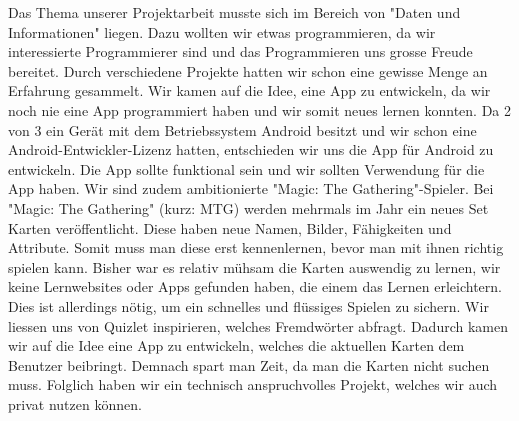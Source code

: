 Das Thema unserer Projektarbeit musste sich im Bereich von "Daten und Informationen" liegen. Dazu wollten wir etwas programmieren, da wir interessierte Programmierer sind und das Programmieren uns grosse Freude bereitet. Durch verschiedene Projekte hatten wir schon eine gewisse Menge an Erfahrung gesammelt. Wir kamen auf die Idee, eine App zu entwickeln, da wir noch nie eine App programmiert haben und wir somit neues lernen konnten. Da 2 von 3 ein Ger\"at mit dem Betriebssystem Android besitzt und wir schon eine Android-Entwickler-Lizenz hatten, entschieden wir uns die App f\"ur Android zu entwickeln. Die App sollte funktional sein und wir sollten Verwendung f\"ur die App haben. Wir sind zudem ambitionierte "Magic: The Gathering"-Spieler. Bei "Magic: The Gathering" (kurz: MTG) werden mehrmals im Jahr ein neues Set Karten ver\"offentlicht. Diese haben neue Namen, Bilder, Fähigkeiten und Attribute. Somit muss man diese erst kennenlernen, bevor man mit ihnen richtig spielen kann. Bisher war es relativ m\"uhsam die Karten auswendig zu lernen, wir keine Lernwebsites oder Apps gefunden haben, die einem das Lernen erleichtern. Dies ist allerdings n\"otig, um ein schnelles und fl\"ussiges Spielen zu sichern. Wir liessen uns von Quizlet inspirieren, welches Fremdw\"orter abfragt. Dadurch kamen wir auf die Idee eine App zu entwickeln, welches die aktuellen Karten dem Benutzer beibringt. Demnach spart man Zeit, da man die Karten nicht suchen muss. Folglich haben wir ein technisch anspruchvolles Projekt, welches wir auch privat nutzen k\"onnen.
